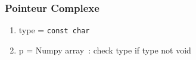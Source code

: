 \begin{frame}
  \frametitle{Pointeur Complexe}
  \begin{enumerate}
  [circle]
  \item type = \texttt{const char \ptr}
  \item p = Numpy array~: check type if type not void
  \end{enumerate}
\end{frame}

